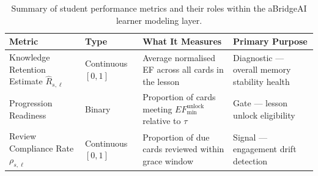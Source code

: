 \begin{table}[H]
\centering
\small
\renewcommand{\arraystretch}{1.4}
\caption{Summary of student performance metrics and their roles within the aBridgeAI learner modeling layer.}
\begin{tabular}{|p{3.2cm}|p{2.2cm}|p{4cm}|p{4cm}|}
\hline
\textbf{Metric} & \textbf{Type} & 
\textbf{What It Measures} & 
\textbf{Primary Purpose} \\
\hline
Knowledge Retention Estimate $\hat{R}_{s,\ell}$ & 
Continuous $[0,1]$ & 
Average normalised EF across all cards in the lesson & 
Diagnostic — overall memory stability health \\
\hline
Progression Readiness & 
Binary & 
Proportion of cards meeting $EF_{\min}^{\text{unlock}}$ 
relative to $\tau$ & 
Gate — lesson unlock eligibility \\
\hline
Review Compliance Rate $\rho_{s,\ell}$ & 
Continuous $[0,1]$ & 
Proportion of due cards reviewed within grace window & 
Signal — engagement drift detection \\
\hline
\end{tabular}
\label{tab:metrics_summary}
\end{table}
